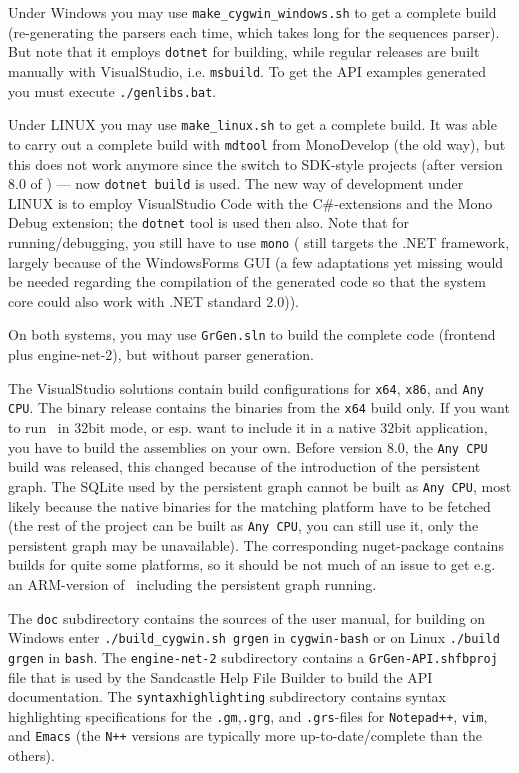 Under Windows you may use \texttt{make\_cygwin\_windows.sh} to get a complete build (re-generating the parsers each time, which takes long for the sequences parser).
But note that it employs \texttt{dotnet} for building, while regular releases are built manually with VisualStudio, i.e. \texttt{msbuild}.
To get the API examples generated you must execute \texttt{./genlibs.bat}.

Under LINUX you may use \texttt{make\_linux.sh} to get a complete build.
It was able to carry out a complete build with \texttt{mdtool} from MonoDevelop (the old way), but this does not work anymore since the switch to SDK-style projects (after version 8.0 of \GrG{}) --- now \texttt{dotnet build} is used.
The new way of development under LINUX is to employ VisualStudio Code with the C\#-extensions and the Mono Debug extension; the \texttt{dotnet} tool is used then also.
Note that for running/debugging, you still have to use \texttt{mono} (\GrG{} still targets the .NET framework, largely because of the WindowsForms GUI (a few adaptations yet missing would be needed regarding the compilation of the generated code so that the system core could also work with .NET standard 2.0)).

On both systems, you may use \texttt{GrGen.sln} to build the complete code (frontend plus engine-net-2), but without parser generation.

The VisualStudio solutions contain build configurations for \texttt{x64}, \texttt{x86}, and \texttt{Any CPU}.
The binary release contains the binaries from the \texttt{x64} build only.
If you want to run \GrG\ in 32bit mode, or esp. want to include it in a native 32bit application, you have to build the assemblies on your own.
Before version 8.0, the \texttt{Any CPU} build was released, this changed because of the introduction of the persistent graph.
The SQLite used by the persistent graph cannot be built as \texttt{Any CPU}, most likely because the native binaries for the matching platform have to be fetched (the rest of the project can be built as \texttt{Any CPU}, you can still use it, only the persistent graph may be unavailable).
The corresponding nuget-package contains builds for quite some platforms, so it should be not much of an issue to get e.g. an ARM-version of \GrGen\ including the persistent graph running.

The \texttt{doc} subdirectory contains the sources of the user manual, for building on Windows enter \texttt{./build\_cygwin.sh grgen} in \texttt{cygwin-bash} or on Linux \texttt{./build grgen} in \texttt{bash}.
The \texttt{engine-net-2} subdirectory contains a \texttt{GrGen-API.shfbproj} file that is used by the Sandcastle Help File Builder to build the API documentation.
The \texttt{syntaxhighlighting} subdirectory contains syntax highlighting specifications for the \texttt{.gm},\texttt{.grg}, and \texttt{.grs}-files for \texttt{Notepad++}, \texttt{vim}, and \texttt{Emacs} (the \texttt{N++} versions are typically more up-to-date/complete than the others).

